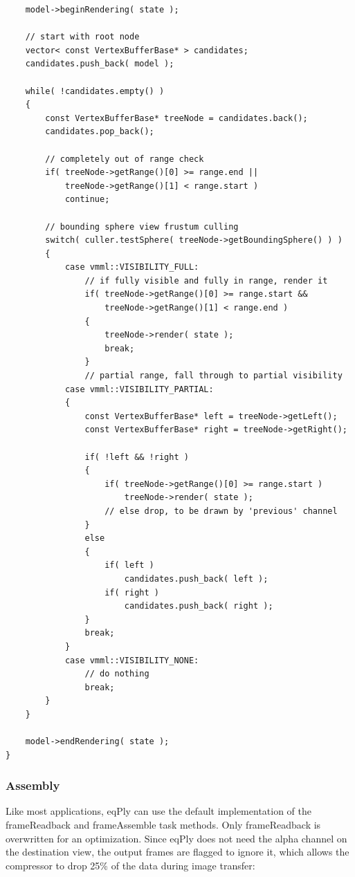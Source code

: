 \documentclass[10pt,a4]{scrartcl}
\begin{document}
{\footnotesize\begin{lstlisting}
    model->beginRendering( state );
        
    // start with root node
    vector< const VertexBufferBase* > candidates;
    candidates.push_back( model );
        
    while( !candidates.empty() )
    {
        const VertexBufferBase* treeNode = candidates.back();
        candidates.pop_back();
            
        // completely out of range check
        if( treeNode->getRange()[0] >= range.end || 
            treeNode->getRange()[1] < range.start )
            continue;
            
        // bounding sphere view frustum culling
        switch( culler.testSphere( treeNode->getBoundingSphere() ) )
        {
            case vmml::VISIBILITY_FULL:
                // if fully visible and fully in range, render it
                if( treeNode->getRange()[0] >= range.start && 
                    treeNode->getRange()[1] < range.end )
                {
                    treeNode->render( state );
                    break;
                }
                // partial range, fall through to partial visibility
            case vmml::VISIBILITY_PARTIAL:
            {
                const VertexBufferBase* left = treeNode->getLeft();
                const VertexBufferBase* right = treeNode->getRight();
            
                if( !left && !right )
                {
                    if( treeNode->getRange()[0] >= range.start )
                        treeNode->render( state );
                    // else drop, to be drawn by 'previous' channel
                }
                else
                {
                    if( left )
                        candidates.push_back( left );
                    if( right )
                        candidates.push_back( right );
                }
                break;
            }
            case vmml::VISIBILITY_NONE:
                // do nothing
                break;
        }
    }
        
    model->endRendering( state );
}
\end{lstlisting}}

\subsubsection{Assembly}

Like most applications, eqPly can use the default implementation of the
\textsf{frameReadback} and \textsf{frameAssemble} task methods. Only
\textsf{frameReadback} is overwritten for an optimization. Since eqPly
does not need the alpha channel on the destination view, the output
frames are flagged to ignore it, which allows the compressor to drop
25\% of the data during image transfer:
\end{document}
